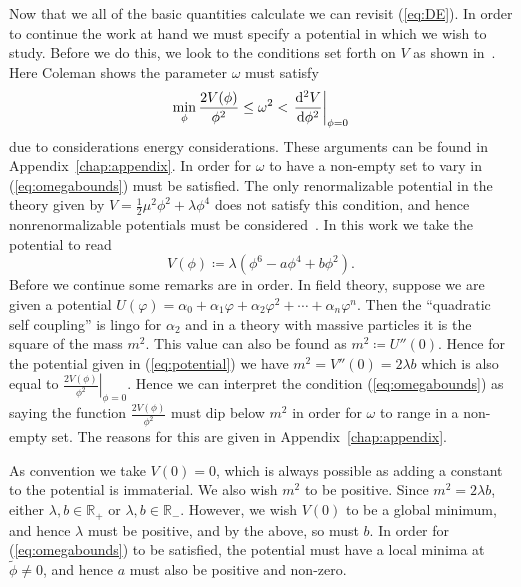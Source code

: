 Now that we all of the basic quantities calculate we can revisit (\ref{eq:DE}).
In order to continue the work at hand we must specify a potential in which we
wish to study. Before we do this, we look to the conditions set forth on \(V\)
as shown in~\cite{coleman}. Here Coleman shows the parameter \(\omega\) must
satisfy
\begin{equation}\label{eq:omegabounds}
    \min_\phi{\frac{2V(\phi)}{\phi^2}}\leq \omega^2 < \left.\dv[2]{V}{\phi}\right|_{\phi = 0}
\end{equation}
due to considerations energy considerations. These arguments can be found in
Appendix~\ref{chap:appendix}. In order for \(\omega\) to have a non-empty set to
vary in (\ref{eq:omegabounds}) must be satisfied. The only renormalizable
potential in the theory given by \(V = \frac{1}{2}\mu^2\phi^2 + \lambda \phi^4\)
does not satisfy this condition, and hence nonrenormalizable potentials must be
considered~\cite{coleman}. In this work we take the potential to read
\begin{equation}\label{eq:potential}
    V(\phi)\coloneqq \lambda\left(\phi^6 - a\phi^4 + b\phi^2\right).
\end{equation}
Before we continue some remarks are in order. In field theory, suppose we are
given a potential \(U(\varphi) = \alpha_0 + \alpha_1\varphi + \alpha_2\varphi^2 + \cdots + \alpha_n\varphi^n\).
Then the ``quadratic self coupling'' is lingo for \(\alpha_2\) and in a theory
with massive particles it is the square of the mass \(m^2\). This value can also
be found as \(m^2\coloneqq U''(0)\). Hence for the potential given in
(\ref{eq:potential}) we have \(m^2 = V''(0) = 2\lambda b\) which is also equal
to \(\left.\frac{2V(\phi)}{\phi^2}\right|_{\phi = 0}\). Hence we can interpret
the condition (\ref{eq:omegabounds}) as saying the function
\(\frac{2V(\phi)}{\phi^2}\) must dip below \(m^2\) in order for \(\omega\) to
range in a non-empty set. The reasons for this are given in Appendix~\ref{chap:appendix}.

As convention we take \(V(0) = 0\), which is always possible as adding a
constant to the potential is immaterial. We also wish \(m^2\) to be positive.
Since \(m^2 = 2\lambda b\), either \(\lambda,b\in\mathbb{R}_+\) or
\(\lambda,b\in\mathbb{R}_-\). However, we wish \(V(0)\) to be a global minimum,
and hence \(\lambda\) must be positive, and by the above, so must \(b\). In
order for (\ref{eq:omegabounds}) to be satisfied, the potential must have a
local minima at \(\tilde{\phi}\neq 0\), and hence \(a\) must also be positive
and non-zero.

